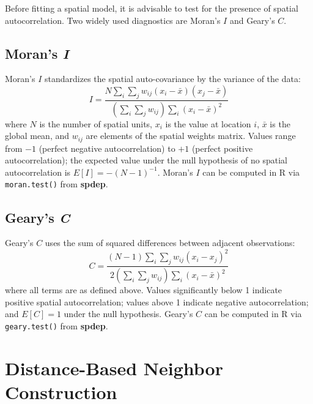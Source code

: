 \documentclass{article}[11pt]
\begin{document}
Before fitting a spatial model, it is advisable to test for the presence of spatial autocorrelation. Two widely used diagnostics are Moran's $\textit{I}$\cite{moran_interpretation_1948}\cite{moran_notes_1950} and Geary's $\textit{C}$\cite{geary_contiguity_1954}\cite{waller_applied_2004}.

\subsection*{Moran's \textit{I}}

Moran's $\textit{I}$ standardizes the spatial auto-covariance by the variance of the data:
\begin{equation}
    \textit{I} = \frac{N \displaystyle\sum_{i}\sum_{j} w_{ij}(x_i - \bar{x})(x_j - \bar{x})}
                       {\left(\displaystyle\sum_{i}\sum_{j} w_{ij}\right)\displaystyle\sum_{i}(x_i - \bar{x})^2}
\end{equation}
where $N$ is the number of spatial units, $x_i$ is the value at location $i$, $\bar{x}$ is the global mean, and $w_{ij}$ are elements of the spatial weights matrix. Values range from $-1$ (perfect negative autocorrelation) to $+1$ (perfect positive autocorrelation); the expected value under the null hypothesis of no spatial autocorrelation is $E[\textit{I}] = -(N-1)^{-1}$. Moran's $\textit{I}$ can be computed in R via \texttt{moran.test()} from \textbf{spdep}\cite{bivand_comparing_2018}.

\subsection*{Geary's \textit{C}}

Geary's $\textit{C}$ uses the sum of squared differences between adjacent observations:
\begin{equation}
    \textit{C} = \frac{(N-1)\displaystyle\sum_{i}\sum_{j} w_{ij}(x_i - x_j)^2}
                       {2\left(\displaystyle\sum_{i}\sum_{j} w_{ij}\right)\displaystyle\sum_{i}(x_i - \bar{x})^2}
\end{equation}
where all terms are as defined above. Values significantly below 1 indicate positive spatial autocorrelation; values above 1 indicate negative autocorrelation; and $E[\textit{C}] = 1$ under the null hypothesis. Geary's $\textit{C}$ can be computed in R via \texttt{geary.test()} from \textbf{spdep}\cite{bivand_comparing_2018}.

\section{Distance-Based Neighbor Construction}\label{appendix:DistanceBased}
\end{document}
